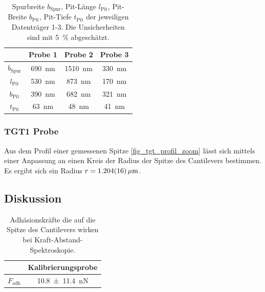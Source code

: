 \documentclass[
	a4paper,
	12pt,
	pagesize,
	ngerman
]{scrartcl}
\begin{document}
\begin{table}[H]
		\centering
		\begin{tabular}{ c | c | c | c }
			 & Probe 1 & Probe 2 & Probe 3\\ \hline
			$b_\text{Spur}$ & \SI{690}{nm} & \SI{1510}{nm} &\SI{330}{nm} \\
			$l_\text{Pit}$ & \SI{530}{nm} & \SI{873}{nm} &\SI{170}{nm} \\
			$b_\text{Pit}$ & \SI{390}{nm} & \SI{682}{nm} &\SI{321}{nm} \\
			$t_\text{Pit}$ & \SI{63}{nm} & \SI{48}{nm} &\SI{41}{nm} \\
		\end{tabular}
		\caption{Spurbreite $b_\text{Spur}$, Pit-Länge $l_\text{Pit}$, Pit-Breite $b_\text{Pit}$, Pit-Tiefe $t_\text{Pit}$ der jeweiligen Datenträger 1-3.
		Die Unsicherheiten sind mit \SI{5}{\%} abgeschätzt.}
		\label{tb_spur}
	\end{table}

	\subsubsection{TGT1 Probe} %
	Aus dem Profil einer gemessenen Spitze \cref{fig_tgt_profil_zoom} lässt sich mittels einer Anpassung an einen Kreis der Radius der Spitze des Cantilevers bestimmen.
	Es ergibt sich ein Radius $r=\SI{1.204 +-0.016}{\mu m}$.

	\subsection{Diskussion}

\begin{table}[H]
		\centering
		\begin{tabular}{ c | c }
			 & Kalibrierungsprobe\\ \hline
			$F_\text{adh}$ & \SI{10.8+-11.4}{nN} \\
		\end{tabular}
		\caption{Adhäsionskräfte die auf die Spitze des Cantilevers wirken bei Kraft-Abstand-Spektroskopie.} %
		\label{tb_ds}
	\end{table}
\end{document}
